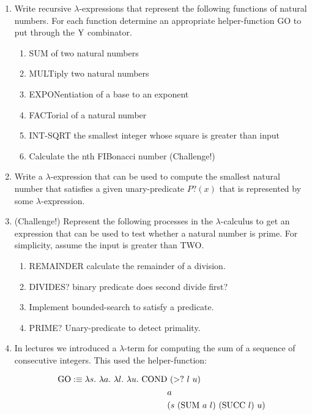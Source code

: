 \documentclass[11pt]{report}
\begin{document}
\begin{enumerate}
	
	\item Write recursive $\lambda$-expressions that represent the following functions of natural numbers. For each function determine an appropriate helper-function GO to put through the $\text{Y}$ combinator. 
	
		\begin{enumerate}
			\item SUM of two natural numbers
			\item MULTiply two natural numbers
			\item EXPONentiation of a base to an exponent
			\item FACTorial of a natural number
			\item INT-SQRT the smallest integer whose square is greater than input
			\item Calculate the nth FIBonacci number (Challenge!)
		\end{enumerate}

	\item Write a $\lambda$-expression that can be used to compute the smallest natural number that satisfies a given unary-predicate $P?(x)$ that is represented by some $\lambda$-expression. 		

	\item (Challenge!) Represent the following processes in the $\lambda$-calculus to get an expression that can be used to test whether a natural number is prime. For simplicity, assume the input is greater than TWO.
	
		\begin{enumerate}
			\item REMAINDER calculate the remainder of a division.
			\item DIVIDES? binary predicate does second divide first?
			\item Implement bounded-search to satisfy a predicate.
			\item PRIME? Unary-predicate to detect primality.
		\end{enumerate}
	

	
	 \item In lectures we introduced a $\lambda$-term for computing the sum of a sequence of consecutive integers. This used the helper-function: 
	
	 \begin{align*}
	 	\GO :\equiv \lambda s. \ \lambda a. \ \lambda l. \ \lambda u. \ \COND & \ (>? \ l \ u) \\
	 	& a \\ 
	 	&(s \ (\SUM \ a \ l) \ (\SUCC \ l) \ u)
	 \end{align*}
	

\end{enumerate}
\end{document}
